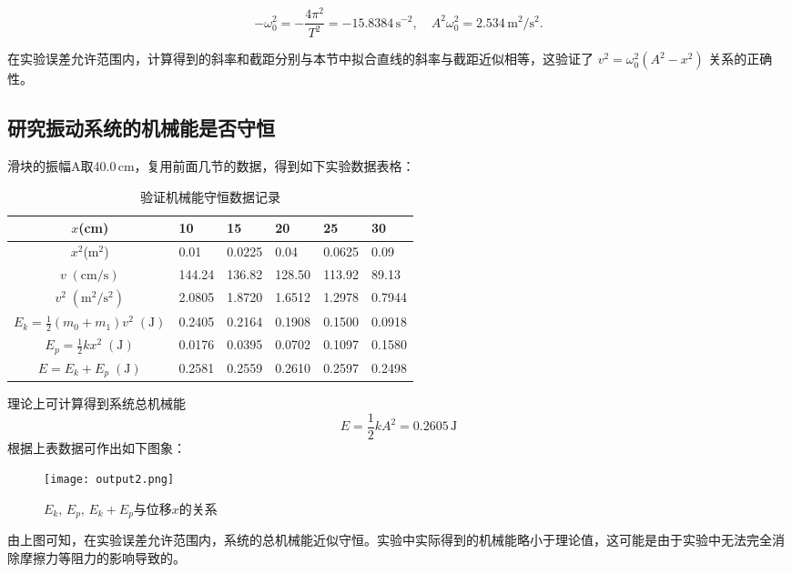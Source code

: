 \documentclass[UTF-8,twoside,cs4size]{ctexart}
\begin{document}
\[
-\omega_0^2 = -\frac{4\pi^2}{T^2} = -15.8384\,\mathrm{s^{-2}},\quad A^2\omega_0^2 = 2.534\,\mathrm{m^2/s^2}.
\]

在实验误差允许范围内，计算得到的斜率和截距分别与本节中拟合直线的斜率与截距近似相等，这验证了 $v^2 = \omega_0^2(A^2 - x^2)$ 关系的正确性。

\subsection{研究振动系统的机械能是否守恒}
滑块的振幅A取40.0\,cm，复用前面几节的数据，得到如下实验数据表格：
\begin{table}[!h]
    \centering
    \renewcommand\arraystretch{1.5}
    \begin{tabularx}{\textwidth}{|c|Y|Y|Y|Y|Y|}			
        \hline
        $ x $\;(cm)&10&15&20&25&30\\
        \hline
        $ x^2 $\;(m$ ^2 $)&0.01&0.0225&0.04&0.0625&0.09\\
        \hline
        $ v\;(\mathrm{cm/s}) $&144.24&136.82&128.50&113.92&89.13\\
        \hline
        $ v^2\;(\mathrm{m^2/s^2}) $&2.0805&1.8720&1.6512&1.2978&0.7944\\
        \hline
        $ E_k=\frac12(m_0+m_1)v^2\;(\mathrm J) $&0.2405&0.2164&0.1908&0.1500&0.0918\\
        \hline
        $ E_p=\frac12kx^2\;(\mathrm J) $&0.0176&0.0395&0.0702&0.1097&0.1580\\
        \hline
        $ E=E_k+E_p\;(\mathrm J) $&0.2581&0.2559&0.2610&0.2597&0.2498\\
        \hline
    \end{tabularx}
    \caption{验证机械能守恒数据记录}
\end{table}

理论上可计算得到系统总机械能
	\[E=\frac 12kA^2=0.2605\,\mathrm J\]
	根据上表数据可作出如下图象：
    \begin{figure}[!h]
        \centering
        \texttt{[image: output2.png]}
        \caption{$ E_k,\,E_p,\,E_k+E_p $与位移$ x $的关系}
    \end{figure}
由上图可知，在实验误差允许范围内，系统的总机械能近似守恒。实验中实际得到的机械能略小于理论值，这可能是由于实验中无法完全消除摩擦力等阻力的影响导致的。
\end{document}
